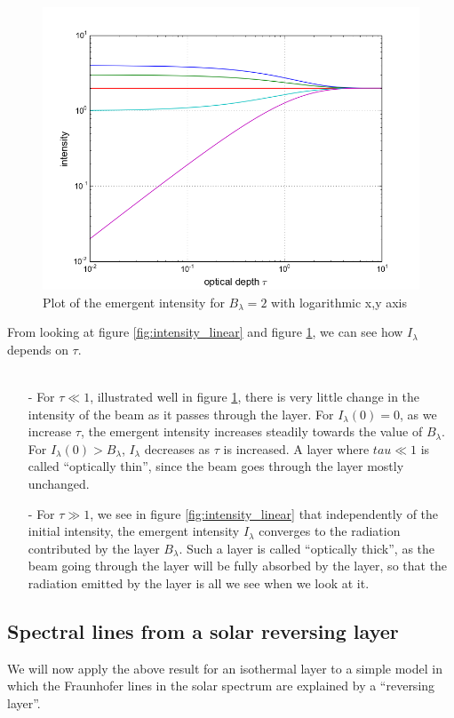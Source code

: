 \documentclass{article}
\begin{document}
\begin{figure}[H]
  \centering
  \includegraphics[scale=0.5]{ssa_3_2_log.png}
  \caption{Plot of the emergent intensity for $B_{\lambda}=2$ with logarithmic x,y axis}
  \label{fig:intensity_loglog}
\end{figure}
From looking at figure \ref{fig:intensity_linear} and figure \ref{fig:intensity_loglog}, we can see how $I_{\lambda}$ depends on $\tau$.\\\\
\begin{itemize}
  \item[-]For $\tau \ll 1$, illustrated well in figure \ref{fig:intensity_loglog}, there is very little change in the intensity of the beam as it passes through the layer. For $I_{\lambda}(0) = 0$, as we increase $\tau$, the emergent intensity increases steadily towards the value of $B_{\lambda}$. For $I_{\lambda}(0) > B_{\lambda}$, $I_{\lambda}$ decreases as $\tau$ is increased. A layer where $tau\ll 1$ is called ``optically thin'', since the beam goes through the layer mostly unchanged.
  \item[-]For $\tau \gg 1$, we see in figure \ref{fig:intensity_linear} that independently of the initial intensity, the emergent intensity $I_{\lambda}$ converges to the radiation contributed by the layer $B_{\lambda}$. Such a layer is called ``optically thick'', as the beam going through the layer will be fully absorbed by the layer, so that the radiation emitted by the layer is all we see when we look at it.
\end{itemize}

\subsection{Spectral lines from a solar reversing layer}
We will now apply the above result for an isothermal layer to a simple model in which the Fraunhofer lines in the solar spectrum are explained by a ``reversing layer''.
\end{document}
